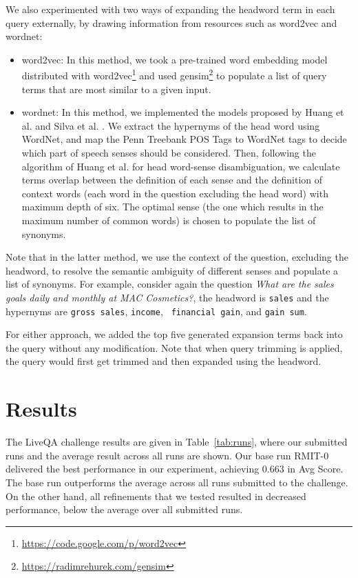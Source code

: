\documentclass[a4paper,10pt,conference,compsocconf,final]{IEEEtran}
\newcommand\method[1]{{\sf\small{#1}}}
\begin{document}
{{{{We also experimented with two ways of expanding the headword term in
each query externally, by drawing information from resources such as
\method{word2vec} and \method{wordnet}:

\begin{itemize}
  \item \method{word2vec}:  
    In this method, we took a pre-trained word
    embedding model distributed with
    \method{word2vec}\footnote{\url{https://code.google.com/p/word2vec}} and
    used \method{gensim}\footnote{\url{https://radimrehurek.com/gensim}} to
    populate a list of query terms that are most similar to a given input.  

  \item \method{wordnet}: In this method, we implemented the models proposed by
    Huang et al. \cite{huang2008question} and Silva et al. \cite{silva2011symbolic}.  We extract the hypernyms of
    the head word using WordNet, and map the Penn Treebank POS Tags to WordNet
    tags to decide which part of speech senses should be considered.  Then,
    following the algorithm of Huang et al. \cite{huang2008question} for head word-sense disambiguation, we calculate terms overlap between the definition of
    each sense and the definition of context words (each word in the question
    excluding the head word) with maximum depth of six. The optimal sense (the one
    which results in the maximum number of common words) is chosen to populate the list
    of synonyms.  
\end{itemize}

Note that in the latter method, we use the context of the question, excluding
the headword, to resolve the semantic ambiguity of different senses and
populate a list of synonyms.  For example, consider again the question \textit{What
are the sales goals daily and monthly at MAC Cosmetics?}, the headword is
{\tt sales} and the hypernyms are {\tt gross sales}, {\tt income}, {\tt
financial gain}, and {\tt gain sum}.

For either approach, we added the top five generated expansion terms back into
the query without any modification.  Note that when query trimming is applied,
the query would first get trimmed and then expanded using the headword.

\section{Results}

The LiveQA challenge results are given in Table~\ref{tab:runs}, where
our submitted runs and the average result across all runs are shown.
Our base run RMIT-0 delivered the best performance in our experiment,
achieving $0.663$ {in} Avg Score.
The base run outperforms the average across all runs submitted to the
challenge.
On the other hand, all refinements that we tested resulted in decreased
performance, below the average over all submitted runs.

}}}}
\end{document}
